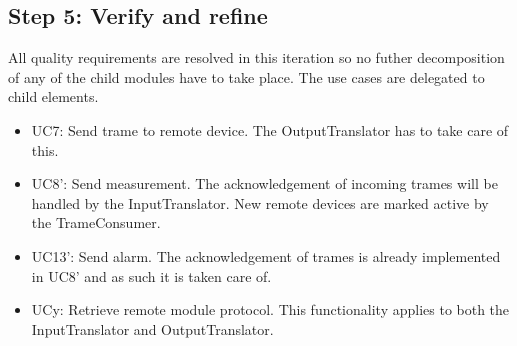 \subsection{Step 5: Verify and refine}
\label{add:it2/verification}

\npar All quality requirements are resolved in this iteration so no futher
decomposition of any of the child modules have to take place. The use cases
are delegated to child elements. 

\begin{itemize}
	\item UC7: Send trame to remote device. The OutputTranslator has to take care
	of this. 
  	\item UC8': Send measurement. The acknowledgement of incoming trames will
  	be handled by the InputTranslator. New remote devices are marked active by
  	the TrameConsumer. 
  	\item UC13': Send alarm. The acknowledgement of trames is already implemented
  	in UC8' and as such it is taken care of.
  	\item UCy: Retrieve remote module protocol. This functionality applies to
  	both the InputTranslator and OutputTranslator. 
\end{itemize}
